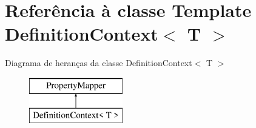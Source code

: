 \hypertarget{class_definition_context}{\section{Referência à classe Template Definition\-Context$<$ T $>$}
\label{class_definition_context}
}
Diagrama de heranças da classe Definition\-Context$<$ T $>$\begin{figure}[H]
\begin{center}
\leavevmode
\includegraphics[height=2.000000cm]{class_definition_context}
\end{center}
\end{figure}
